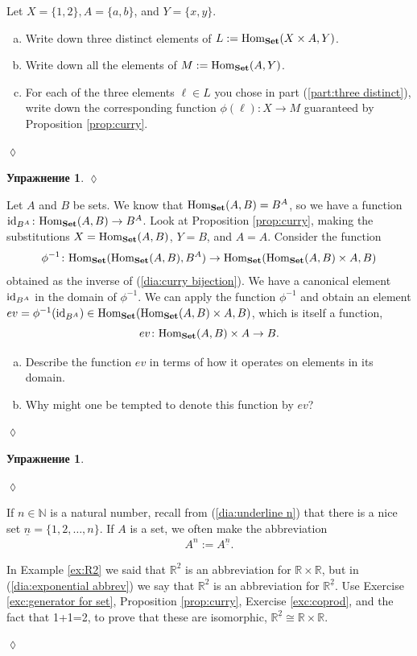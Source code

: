 \documentclass[a4paper]{book}
\def\tn{\textnormal}
\def\RR{{\mathbb R}}
\def\NN{{\mathbb N}}
\def\Hom{\tn{Hom}}
\def\to{\rightarrow}
\def\taking{\colon}
\def\iso{\cong}
\def\m1{{-1}}
\def\ul{\underline}
\def\id{\tn{id}}
\def\Set{{\bf Set}}
\theoremstyle{myth}
\newtheorem{excENG}[envENG]{\begin{english}Exercise\end{english}}
\newenvironment{exerciseENG}{\begin{excENG}}{\hspace*{\fill}$\lozenge$\end{excENG}}
\newtheorem{excRUS}[envRUS]{Упражнение}
\newenvironment{exerciseRUS}{\begin{excRUS}}{\hspace*{\fill}$\lozenge$\end{excRUS}}
\def\sexc{\begin{enumerate}[a.)]\setlength{\itemsep}{.1cm}\setlength{\parskip}{.1cm}\item}
\def\next{\item}
\def\endsexc{\end{enumerate}}
\begin{document}
\begin{russian}
\begin{exerciseENG}
Let $X=\{1,2\}, A=\{a,b\}$, and $Y=\{x,y\}$. 
\sexc\label{part:three distinct} Write down three distinct elements of $L:=\Hom_\Set(X\times A,Y)$. 
\next Write down all the elements of $M:=\Hom_\Set(A,Y)$. 
\next For each of the three elements $\ell\in L$ you chose in part (\ref{part:three distinct}), write down the corresponding function $\phi(\ell)\taking X\to M$ guaranteed by Proposition \ref{prop:curry}.
\endsexc
\end{exerciseENG}

\begin{exerciseRUS}
 
\end{exerciseRUS}

\begin{exerciseENG}\label{exc:evaluation}
Let $A$ and $B$ be sets. We know that $\Hom_\Set(A,B)=B^A$, so we have a function $\id_{B^A}\taking\Hom_\Set(A,B)\to B^A$. Look at Proposition \ref{prop:curry}, making the substitutions $X=\Hom_\Set(A,B)$, $Y=B$, and  $A=A$. Consider the function $$\phi^\m1\taking\Hom_\Set(\Hom_\Set(A,B),B^A)\to\Hom_\Set(\Hom_\Set(A,B)\times A,B)$$ obtained as the inverse of (\ref{dia:curry bijection}). We have a canonical element $\id_{B^A}$ in the domain of $\phi^\m1$. We can apply the function $\phi^\m1$ and obtain an element $ev=\phi^\m1(\id_{B^A})\in\Hom_\Set(\Hom_\Set(A,B)\times A,B)$, which is itself a function, $$ev\taking\Hom_\Set(A,B)\times A\to B.$$ 
\sexc Describe the function $ev$ in terms of how it operates on elements in its domain. 
\next Why might one be tempted to denote this function by $ev$?
\endsexc
\end{exerciseENG}

\begin{exerciseRUS}\label{exc:evaluation}
 
\end{exerciseRUS}

If $n\in\NN$ is a natural number, recall from (\ref{dia:underline n}) that there is a nice set $\ul{n}=\{1,2,\ldots,n\}$. If $A$ is a set, we often make the abbreviation 
\begin{align}\label{dia:exponential abbrev}
A^n:=A^{\ul{n}}.
\end{align}

 

\begin{exerciseENG}\label{exc:two R2s}
In Example \ref{ex:R2} we said that $\RR^2$ is an abbreviation for $\RR\times\RR$, but in (\ref{dia:exponential abbrev}) we say that $\RR^2$ is an abbreviation for $\RR^{\ul{2}}$. Use Exercise \ref{exc:generator for set}, Proposition \ref{prop:curry}, Exercise \ref{exc:coprod}, and the fact that 1+1=2, to prove that these are isomorphic, $\RR^{\ul{2}}\iso\RR\times\RR$.


\end{exerciseENG}
\end{russian}
\end{document}
